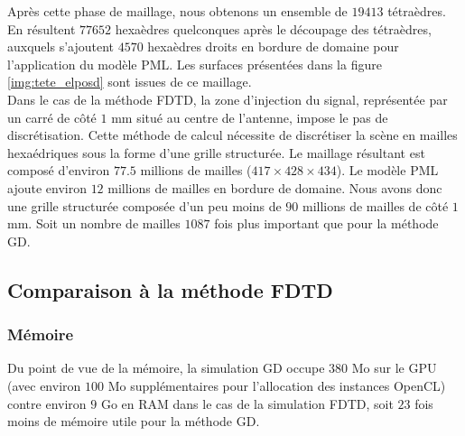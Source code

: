 \begin{figure}[!h]
\begin{center}
{
		}
	\end{center}
\end{figure}

Après cette phase de maillage, nous obtenons un ensemble de $19413$ tétraèdres.
En résultent $77652$ hexaèdres quelconques après le découpage des tétraèdres,
auxquels s'ajoutent $4570$ hexaèdres droits en bordure de domaine pour
l'application du modèle PML.
Les surfaces présentées dans la figure \ref{img:tete_elposd}
sont issues de ce maillage.
\\

Dans le cas de la méthode FDTD, la zone d'injection
du signal, représentée par un carré de côté $1$ mm
situé au centre de l'antenne,
impose le pas de discrétisation.
Cette méthode de calcul nécessite de discrétiser la scène en mailles
hexaédriques sous la forme d'une grille structurée.
Le maillage résultant est composé d'environ $77.5$ millions de mailles
($417 \times 428 \times 434$).
Le modèle PML ajoute environ $12$ millions de mailles en bordure
de domaine.
Nous avons donc une grille structurée composée d'un peu moins de $90$ millions
de mailles de côté $1$ mm.
Soit un nombre de mailles $1087$ fois plus important que pour la méthode GD.
\\


\subsection{Comparaison à la méthode FDTD}
\label{ssect:tete_simplifiee_comp}

\subsubsection{Mémoire}
\label{sssect:tete_simplifiee_comp_mem}

Du point de vue de la mémoire, la simulation GD occupe $380$ Mo sur le GPU
(avec environ $100$ Mo supplémentaires pour l'allocation des instances OpenCL)
contre environ $9$ Go en RAM dans le cas de la simulation FDTD, soit
$23$ fois moins de mémoire utile pour la méthode GD.


